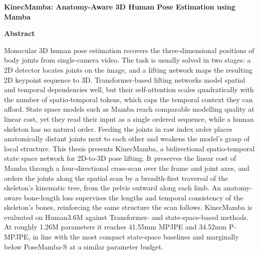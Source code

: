 \documentclass{article}
\begin{document}
\pagestyle{empty}
\thispagestyle{empty}

\begin{center}
    {\LARGE \bf \noindent KinecMamba: Anatomy-Aware 3D Human Pose Estimation using Mamba}
\end{center}

\vspace{0.2in}
{\bf \noindent Abstract}\\
\vspace{-0.1in}

\noindent Monocular 3D human pose estimation recovers the three-dimensional
positions of body joints from single-camera video. The task is usually solved in
two stages: a 2D detector locates joints on the image, and a lifting network maps
the resulting 2D keypoint sequence to 3D. Transformer-based lifting networks model
spatial and temporal dependencies well, but their self-attention scales
quadratically with the number of spatio-temporal tokens, which caps the temporal
context they can afford. State space models such as Mamba reach comparable modelling
quality at linear cost, yet they read their input as a single ordered sequence,
while a human skeleton has no natural order. Feeding the joints in raw index order
places anatomically distant joints next to each other and weakens the model's grasp
of local structure. This thesis presents KinecMamba, a bidirectional spatio-temporal
state space network for 2D-to-3D pose lifting. It preserves the linear cost of Mamba
through a four-directional cross-scan over the frame and joint axes, and orders the
joints along the spatial scan by a breadth-first traversal of the skeleton's
kinematic tree, from the pelvis outward along each limb. An anatomy-aware
bone-length loss supervises the lengths and temporal consistency of the
skeleton's bones, reinforcing the same structure the scan follows. KinecMamba
is evaluated on Human3.6M against Transformer- and state-space-based methods.
At roughly 1.26M parameters it reaches 41.55mm MPJPE and 34.52mm P-MPJPE, in
line with the most compact state-space baselines and marginally below
PoseMamba-S at a similar parameter budget.
\end{document}
